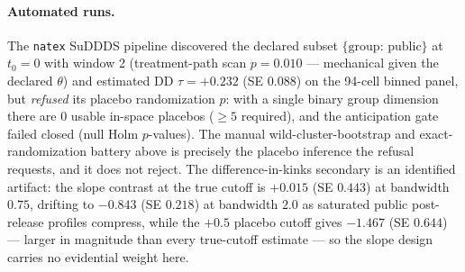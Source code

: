 \documentclass[11pt]{article}
\newcommand{\natex}{\texttt{natex}}
\begin{document}
\paragraph{Automated runs.} The \natex{} SuDDDS pipeline discovered the
declared subset $\{\mathrm{group{:}\,public}\}$ at $t_0=0$ with window 2
(treatment-path scan $p=0.010$ --- mechanical given the declared $\theta$)
and estimated DD $\tau=+0.232$ (SE $0.088$) on the 94-cell binned panel,
but \emph{refused} its placebo randomization $p$: with a single binary
group dimension there are 0 usable in-space placebos ($\geq 5$ required),
and the anticipation gate failed closed (null Holm $p$-values). The manual
wild-cluster-bootstrap and exact-randomization battery above is precisely
the placebo inference the refusal requests, and it does not reject. The
difference-in-kinks secondary is an identified artifact: the slope contrast
at the true cutoff is $+0.015$ (SE $0.443$) at bandwidth $0.75$, drifting
to $-0.843$ (SE $0.218$) at bandwidth $2.0$ as saturated public
post-release profiles compress, while the $+0.5$ placebo cutoff gives
$-1.467$ (SE $0.644$) --- larger in magnitude than every true-cutoff
estimate --- so the slope design carries no evidential weight here.
\end{document}
